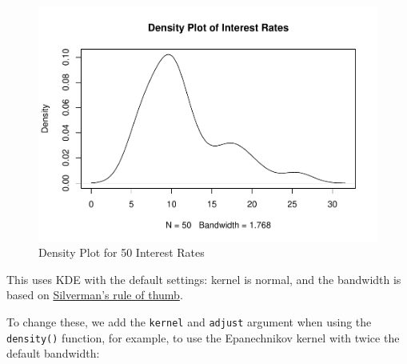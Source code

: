 \documentclass[
]{book}
\newenvironment{Shaded}{\begin{snugshade}}{\end{snugshade}}
\newcommand{\AttributeTok}[1]{\textcolor[rgb]{0.13,0.29,0.53}{#1}}
\newcommand{\DecValTok}[1]{\textcolor[rgb]{0.00,0.00,0.81}{#1}}
\newcommand{\DocumentationTok}[1]{\textcolor[rgb]{0.56,0.35,0.01}{\textbf{\textit{#1}}}}
\newcommand{\FunctionTok}[1]{\textcolor[rgb]{0.13,0.29,0.53}{\textbf{#1}}}
\newcommand{\NormalTok}[1]{#1}
\newcommand{\SpecialCharTok}[1]{\textcolor[rgb]{0.81,0.36,0.00}{\textbf{#1}}}
\newcommand{\StringTok}[1]{\textcolor[rgb]{0.31,0.60,0.02}{#1}}
\begin{document}
\begin{figure}
\centering
\includegraphics{bookdown-demo_files/figure-latex/4-R-1.pdf}
\caption{\label{fig:4-R}Density Plot for 50 Interest Rates}
\end{figure}

This uses KDE with the default settings: kernel is normal, and the bandwidth is based on \href{https://en.wikipedia.org/wiki/Kernel_density_estimation\#A_rule-of-thumb_bandwidth_estimator}{Silverman's rule of thumb}.

To change these, we add the \texttt{kernel} and \texttt{adjust} argument when using the \texttt{density()} function, for example, to use the Epanechnikov kernel with twice the default bandwidth:

\begin{Shaded}
\end{Shaded}
\end{document}
